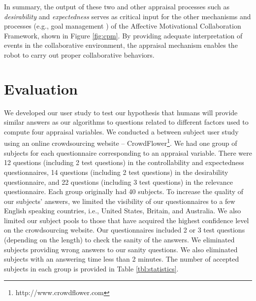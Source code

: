 \documentclass{article}
\begin{document}
In summary, the output of these two and other appraisal processes such as
\textit{desirability} \cite{shayganfar:emotional-awareness} and
\textit{expectedness} \cite{shayganfar:appraisal-short} serves as critical input
for the other mechanisms and processes (e.g., goal management
\cite{shayganfar:goal-management}) of the Affective Motivational Collaboration
Framework, shown in Figure \ref{fig:cpm}. By providing adequate interpretation
of events in the collaborative environment, the appraisal mechanism enables the
robot to carry out proper collaborative behaviors.

\vspace{-2mm}
\section{Evaluation}
\label{sec:user-study}

We developed our user study to test our hypothesis that humans will provide
similar answers as our algorithms to questions related to different factors used
to compute four appraisal variables. We conducted a between subject user study
using an online crowdsourcing website --
CrowdFlower\footnote{http://www.crowdflower.com}. We had one group of
subjects for each questionnaire corresponding to an appraisal variable.
There were 12 questions (including 2 test questions) in the controllability and
expectedness questionnaires, 14 questions (including 2 test questions) in
the desirability questionnaire, and 22 questions (including 3 test questions) in
the relevance questionnaire. Each group originally had 40 subjects. To increase
the quality of our subjects' answers, we limited the visibility of our
questionnaires to a few English speaking countries, i.e., United States,
Britain, and Australia. We also limited our subject pools to those that have
acquired the highest confidence level on the crowdsourcing website. Our
questionnaires included 2 or 3 test questions (depending on the length) to check
the sanity of the answers. We eliminated subjects providing wrong answers to our
sanity questions. We also eliminated subjects with an answering time less than 2
minutes. The number of accepted subjects in each group is provided in Table
\ref{tbl:statistics}.
\end{document}
